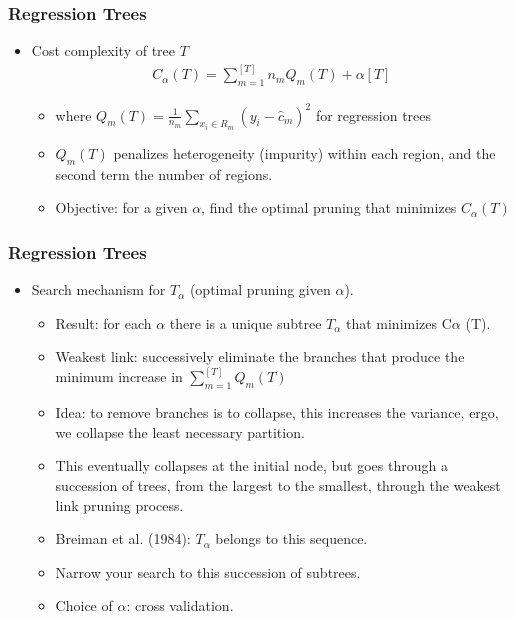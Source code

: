 \documentclass[
  shownotes,
  xcolor={svgnames},
  hyperref={colorlinks,citecolor=DarkBlue,linkcolor=DarkRed,urlcolor=DarkBlue}
  ]{beamer}
\begin{document}
\begin{frame}[fragile]
\frametitle{Regression Trees}

\begin{itemize}
\item Cost complexity of tree $T$
\begin{align}
  C_{\alpha}(T)= \sum_{m=1}^{[T]} n_m Q_m (T) + \alpha [T]
\end{align}

  \begin{itemize}
  \item where $Q_m (T)=\frac{1}{n_m} \sum_{x_i\in R_m} (y_i-\hat{c}_m)^2$ for regression trees
  \item  $Q_m (T)$ penalizes heterogeneity (impurity) within each region, and the second term the number of regions.
  \item  Objective: for a given $\alpha$, find the optimal pruning that minimizes $C_{\alpha}(T)$
  \end{itemize}
\end{itemize}
\end{frame}

\begin{frame}[fragile]
\frametitle{Regression Trees}

\begin{itemize}
\item Search mechanism for $T_\alpha$ (optimal pruning given $\alpha$).
\begin{itemize}
\item Result: for each $\alpha$ there is a unique subtree $T_\alpha$ that minimizes C$\alpha$ (T).
\item Weakest link: successively eliminate the branches that produce the minimum increase in   $\sum_{m=1}^{[T]}  Q_m (T)$
\item Idea: to remove branches is to collapse, this increases the variance, ergo, we collapse the least necessary partition.
\item This eventually collapses at the initial node, but goes through a succession of trees, from the largest to the smallest, through the weakest link pruning process.
\item Breiman et al. (1984): $T_\alpha$ belongs to this sequence. 
\item Narrow your search to this succession of subtrees. 
\item Choice of $\alpha$: cross validation.
\end{itemize}

\end{itemize}




\end{frame}
\end{document}
